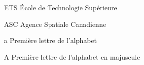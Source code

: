 \documentclass[letterpaper%
, twoside%
, 12pt%
,thesepararticles%
, english%
,creativecommons,hyperref, withAlgo2e%
]{thETS}
\begin{document}
\tableofcontents


\listoftables


\listoffigures

\listofalgorithms


\begin{listofabbr}[3cm]
\item [ETS] École de Technologie Supérieure
\item [ASC] Agence Spatiale Canadienne
\end{listofabbr}


\begin{listofsymbols}[3cm]
\item [a] Première lettre de l'alphabet
\item [A] Première lettre de l'alphabet en majuscule
\end{listofsymbols}


\cleardoublepage


\reversemarginpar

\end{document}
